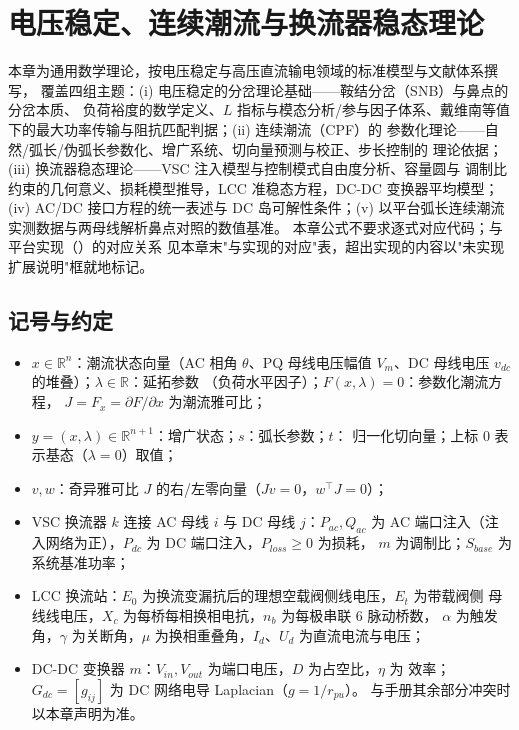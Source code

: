 
\section{电压稳定、连续潮流与换流器稳态理论}\label{sec:pf-th-vs}

\begin{theorynote}
本章为通用数学理论，按电压稳定与高压直流输电领域的标准模型与文献体系撰写，
覆盖四组主题：(i) 电压稳定的分岔理论基础——鞍结分岔（SNB）与鼻点的分岔本质、
负荷裕度的数学定义、$L$ 指标与模态分析/参与因子体系、戴维南等值下的最大功率传输与阻抗匹配判据；(ii) 连续潮流（CPF）的
参数化理论——自然/弧长/伪弧长参数化、增广系统、切向量预测与校正、步长控制的
理论依据；(iii) 换流器稳态理论——VSC 注入模型与控制模式自由度分析、容量圆与
调制比约束的几何意义、损耗模型推导，LCC 准稳态方程，DC-DC 变换器平均模型；
(iv) AC/DC 接口方程的统一表述与 DC 岛可解性条件；(v) 以平台弧长连续潮流实测数据与两母线解析鼻点对照的数值基准。
本章公式不要求逐式对应代码；与平台实现（）的对应关系
见本章末"与实现的对应"表，超出实现的内容以"未实现扩展说明"框就地标记。
\end{theorynote}

\subsection{记号与约定}\label{sec:pf-th-vs-notation}
\begin{itemize}
  \item $x\in\mathbb{R}^{n}$：潮流状态向量（AC 相角 $\theta$、PQ 母线电压幅值
        $V_m$、DC 母线电压 $v_{dc}$ 的堆叠）；$\lambda\in\mathbb{R}$：延拓参数
        （负荷水平因子）；$F(x,\lambda)=0$：参数化潮流方程，
        $J=F_x=\partial F/\partial x$ 为潮流雅可比；
  \item $y=(x,\lambda)\in\mathbb{R}^{n+1}$：增广状态；$s$：弧长参数；$t$：
        归一化切向量；上标 $0$ 表示基态（$\lambda=0$）取值；
  \item $v,w$：奇异雅可比 $J$ 的右/左零向量（$Jv=0$，$w^{\top}J=0$）；
  \item VSC 换流器 $k$ 连接 AC 母线 $i$ 与 DC 母线 $j$：$P_{ac},Q_{ac}$ 为 AC
        端口注入（注入网络为正），$P_{dc}$ 为 DC 端口注入，$P_{loss}\ge0$ 为损耗，
        $m$ 为调制比；$S_{base}$ 为系统基准功率；
  \item LCC 换流站：$E_0$ 为换流变漏抗后的理想空载阀侧线电压，$E_t$ 为带载阀侧
        母线线电压，$X_c$ 为每桥每相换相电抗，$n_b$ 为每极串联 6 脉动桥数，
        $\alpha$ 为触发角，$\gamma$ 为关断角，$\mu$ 为换相重叠角，$I_d$、$U_d$
        为直流电流与电压；
  \item DC-DC 变换器 $m$：$V_{in},V_{out}$ 为端口电压，$D$ 为占空比，$\eta$ 为
        效率；$G_{dc}=[g_{ij}]$ 为 DC 网络电导 Laplacian（$g=1/r_{pu}$）。
  与手册其余部分冲突时以本章声明为准。
\end{itemize}

